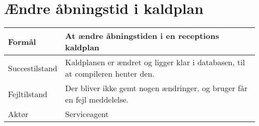 


\pagebreak

\section{Ændre åbningstid i kaldplan}
\begin{table}[h]
    \begin{tabular}{|p{3cm}|p{8.3cm}|}
    \hline
    Formål         & At ændre åbningstiden i en receptions kaldplan                              \\ \hline
    Succestilstand & Kaldplanen er ændret og ligger klar i databasen, til at compileren henter den.                         \\ \hline
    Fejltilstand   & Der bliver ikke gemt nogen ændringer, og bruger får en fejl meddelelse. \\ \hline
    Aktør          & Serviceagent                                                                \\ \hline
    \end{tabular}
\end{table}

